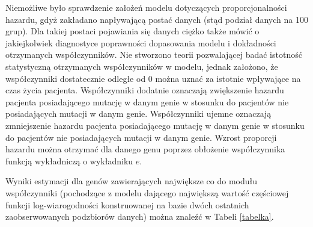 Niemożliwe było sprawdzenie założeń modelu dotyczących proporcjonalności
hazardu, gdyż zakładano napływającą postać danych (stąd podział danych
na 100 grup). Dla takiej postaci pojawiania się danych ciężko także
mówić o jakiejkolwiek diagnostyce poprawności dopasowania modelu i
dokładności otrzymanych współczynników. Nie stworzono teorii
pozwalającej badać istotność statystyczną otrzymanych współczynników w
modelu, jednak założono, że współczynniki dostatecznie odległe od \(0\)
można uznać za istotnie wpływające na czas życia pacjenta. Współczynniki
dodatnie oznaczają zwiększenie hazardu pacjenta posiadającego mutację w
danym genie w stosunku do pacjentów nie posiadających mutacji w danym
genie. Współczynniki ujemne oznaczają zmniejszenie hazardu pacjenta
posiadającego mutację w danym genie w stosunku do pacjentów nie
posiadających mutacji w danym genie. Wzrost proporcji hazardu można
otrzymać dla danego genu poprzez obłożenie współczynnika funkcją
wykładniczą o wykładniku \(e\).


Wyniki estymacji dla genów zawierających największe co do modułu
współczynniki (pochodzące z modelu dającego największą wartość częściowej funkcji log-wiarogodności konstruowanej na bazie dwóch ostatnich zaobserwowanych podzbiorów danych) można znaleźć w Tabeli \ref{tabelka}.

